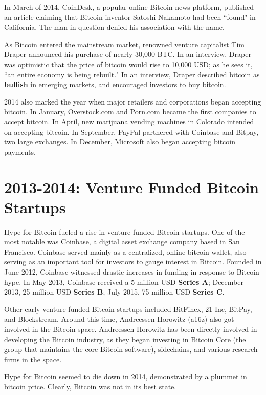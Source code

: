 \documentclass[11pt]{article}
\begin{document}
    In March of 2014, CoinDesk, a popular online Bitcoin news platform, published an article claiming that Bitcoin inventor Satoshi Nakamoto had been ``found" in California. The man in question denied his association with the name.
    
    As Bitcoin entered the mainstream market, renowned venture capitalist Tim Draper announced his purchase of nearly 30,000 BTC. In an interview, Draper was optimistic that the price of bitcoin would rise to 10,000 USD; as he sees it, ``an entire economy is being rebuilt." In an interview, Draper described bitcoin as \textbf{bullish} in emerging markets, and encouraged investors to buy bitcoin.
    
    2014 also marked the year when major retailers and corporations began accepting bitcoin. In January, Overstock.com and Porn.com became the first companies to accept bitcoin. In April, new marijuana vending machines in Colorado intended on accepting bitcoin. In September, PayPal partnered with Coinbase and Bitpay, two large exchanges. In December, Microsoft also began accepting bitcoin payments.
    \section*{2013-2014: Venture Funded Bitcoin Startups} 
    
    Hype for Bitcoin fueled a rise in venture funded Bitcoin startups. One of the most notable was Coinbase, a digital asset exchange company based in San Francisco. Coinbase served mainly as a centralized, online bitcoin wallet, also serving as an important tool for investors to gauge interest in Bitcoin. Founded in June 2012, Coinbase witnessed drastic increases in funding in response to Bitcoin hype. In May 2013, Coinbase received a 5 million USD \textbf{Series A}; December 2013, 25 million USD \textbf{Series B}; July 2015, 75 million USD \textbf{Series C}.
    
    Other early venture funded Bitcoin startups included BitFinex, 21 Inc, BitPay, and Blockstream. Around this time, Andreessen Horowitz (a16z) also got involved in the Bitcoin space. Andreessen Horowitz has been directly involved in developing the Bitcoin industry, as they began investing in Bitcoin Core (the group that maintains the core Bitcoin software), sidechains, and various research firms in the space.
    
    Hype for Bitcoin seemed to die down in 2014, demonstrated by a plummet in bitcoin price. Clearly, Bitcoin was not in its best state.
    
\end{document}
